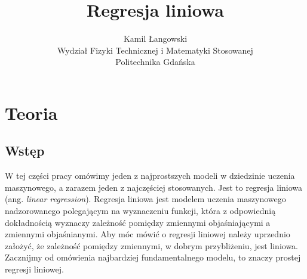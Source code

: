 \documentclass[a4paper]{article}
\title{Regresja liniowa}
\author{Kamil Łangowski \\ Wydział Fizyki Technicznej i Matematyki Stosowanej \\ Politechnika Gdańska}
\begin{document}
\maketitle
\newpage
\section{Teoria}

\subsection{Wstęp}
W tej części pracy omówimy jeden z najprostszych modeli w dziedzinie uczenia maszynowego, a zarazem jeden z najczęściej stosowanych. Jest to regresja liniowa (ang. \textit{linear regression}). Regresja liniowa jest modelem uczenia maszynowego nadzorowanego polegającym na wyznaczeniu funkcji, która z odpowiednią dokładnością wyznaczy zależność pomiędzy zmiennymi objaśniającymi a zmiennymi objaśnianymi. Aby móc mówić o regresji liniowej należy uprzednio założyć, że zależność pomiędzy zmiennymi, w dobrym przybliżeniu, jest liniowa. Zacznijmy od omówienia najbardziej fundamentalnego modelu, to znaczy prostej regresji liniowej.
\end{document}
